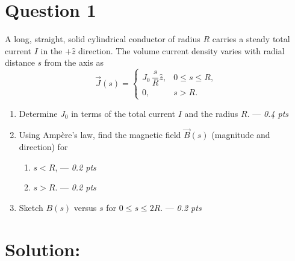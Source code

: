 \section*{Question 1}
A long, straight, solid cylindrical conductor of radius $R$ carries a steady total current $I$ in the $+\hat z$ direction.  The volume current density varies with radial distance $s$ from the axis as
\begin{equation*}
    \vec{J}(s) = 
    \begin{cases}
    J_0\,\dfrac{s}{R}\hat{z}, & 0 \le s \le R,\\[6pt]
    0, & s > R.
    \end{cases}
\end{equation*}
    \begin{enumerate}
      \item[(a)]  Determine \(J_0\) in terms of the total current \(I\) and the radius \(R\). --- \textit{0.4 pts}
      \item[(b)]  Using Ampère’s law, find the magnetic field \(\vec{B}(s)\) (magnitude and direction) for
      \begin{enumerate}
        \item[(i)] \(s < R\), --- \textit{0.2 pts}
        \item[(ii)] \(s > R\). --- \textit{0.2 pts}
      \end{enumerate}
      \item[(c)]  Sketch \(B(s)\) versus \(s\) for \(0 \le s \le 2R\). --- \textit{0.2 pts}
    \end{enumerate}


\section*{Solution:}
